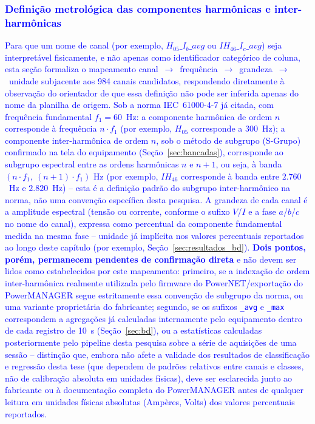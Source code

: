 \documentclass[times,final]{elsarticle}
\begin{document}
\textcolor{blue}{\subsubsection{Definição metrológica das componentes harmônicas e inter-harmônicas}
\label{sec:definicao_metrologica}
Para que um nome de canal (por exemplo, $H_{05}\_I_b\_avg$ ou $IH_{46}\_I_c\_avg$) seja interpretável fisicamente, e não apenas como identificador categórico de coluna, esta seção formaliza o mapeamento canal~$\to$~frequência~$\to$~grandeza~$\to$~unidade subjacente aos 984 canais candidatos, respondendo diretamente à observação do orientador de que essa definição não pode ser inferida apenas do nome da planilha de origem. Sob a norma IEC~61000-4-7 já citada, com frequência fundamental $f_1=60$~Hz: a componente harmônica de ordem $n$ corresponde à frequência $n \cdot f_1$ (por exemplo, $H_{05}$ corresponde a $300$~Hz); a componente inter-harmônica de ordem $n$, sob o método de subgrupo (S-Grupo) confirmado na tela do equipamento (Seção~\ref{sec:bancadas}), corresponde ao subgrupo espectral entre as ordens harmônicas $n$ e $n+1$, ou seja, à banda $(n \cdot f_1,\ (n{+}1) \cdot f_1)$ Hz (por exemplo, $IH_{46}$ corresponde à banda entre $2.760$~Hz e $2.820$~Hz) -- esta é a definição padrão do subgrupo inter-harmônico na norma, não uma convenção específica desta pesquisa. A grandeza de cada canal é a amplitude espectral (tensão ou corrente, conforme o sufixo $V$/$I$ e a fase $a$/$b$/$c$ no nome do canal), expressa como percentual da componente fundamental medida na mesma fase -- unidade já implícita nos valores percentuais reportados ao longo deste capítulo (por exemplo, Seção~\ref{sec:resultados_bd}). \textbf{Dois pontos, porém, permanecem pendentes de confirmação direta} e não devem ser lidos como estabelecidos por este mapeamento: primeiro, se a indexação de ordem inter-harmônica realmente utilizada pelo firmware do PowerNET/exportação do PowerMANAGER segue estritamente essa convenção de subgrupo da norma, ou uma variante proprietária do fabricante; segundo, se os sufixos \texttt{\_avg} e \texttt{\_max} correspondem a agregações já calculadas internamente pelo equipamento dentro de cada registro de 10~s (Seção~\ref{sec:bd}), ou a estatísticas calculadas posteriormente pelo pipeline desta pesquisa sobre a série de aquisições de uma sessão -- distinção que, embora não afete a validade dos resultados de classificação e regressão desta tese (que dependem de padrões relativos entre canais e classes, não de calibração absoluta em unidades físicas), deve ser esclarecida junto ao fabricante ou à documentação completa do PowerMANAGER antes de qualquer leitura em unidades físicas absolutas (Ampères, Volts) dos valores percentuais reportados.}
\end{document}

